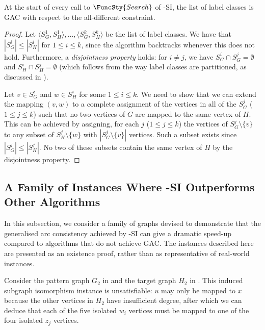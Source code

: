 \begin{proposition}\label{gacProposition}
    At the start of every call to $\FuncSty{Search}$ of
    \McSplit-SI, the list of label classes is GAC with respect to 
    the all-different constraint.
\end{proposition}

\begin{proof}
Let $\langle S_G^1, S_H^1 \rangle, \dots, \langle S_G^k, S_H^k \rangle$ be the list of
label classes.  
We have that $|S_G^i| \leq |S_H^i|$ for $1 \leq i \leq k$, since the algorithm
backtracks whenever this does not hold.
Furthermore, a \emph{disjointness property} holds: for $i \not= j$, we have
    $S_G^i \cap S_G^j = \emptyset$ and $S_H^i \cap S_H^j =
    \emptyset$ (which follows from the way label classes are partitioned,
    as discussed in ).

Let $v \in S_G^i$ and $w \in S_H^i$ for some $1 \leq i \leq k$.  We need to show that we
can extend the mapping
$(v,w)$ to a complete assignment of the vertices in all of the $S_G^j$ ($1 \leq j \leq k$)
such that no two vertices of $G$ are mapped to the same vertex of $H$.
This can be achieved by assigning, for each $j$ ($1 \leq j \leq k$) the vertices of
$S_G^j \setminus \{v\}$ to any subset of
$S_H^j \setminus \{w\}$ with $|S_G^j \setminus \{v\}|$ vertices.
Such a subset exists since $|S_G^j| \leq |S_H^j|$. No two of these subsets
contain the same vertex of $H$ by the disjointness property.
\end{proof}

\subsection{A Family of Instances Where \McSplit-SI Outperforms Other Algorithms}

In this subsection, we consider a family of graphs devised to demonstrate
that the generalised arc consistency achieved by \McSplit-SI can give a dramatic
speed-up compared to algorithms that do not achieve GAC.
The instances described here are presented as an existence proof, rather than
as representative of real-world instances.

Consider the pattern graph $G_2$ in  and the target
graph $H_2$ in .  This induced subgraph isomorphism
instance is unsatisfiable: $u$ may only be mapped to $x$ because the other
vertices in $H_2$ have insufficient degree, after which we can deduce
that each of the five isolated $w_i$ vertices must be mapped to one of the four
isolated $z_j$ vertices.

